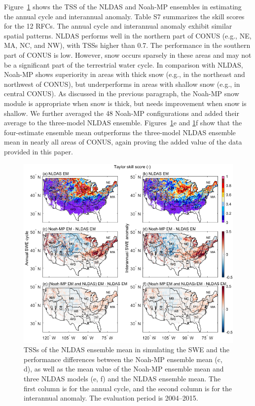 \documentclass[essd, manuscript]{copernicus}
\begin{document}
Figure~\ref{fig:swe:anom:tss} shows the TSS of the NLDAS and Noah-MP ensembles in estimating the annual cycle and interannual anomaly. Table S7 summarizes the skill scores for the 12 RFCs. The annual cycle and interannual anomaly exhibit similar spatial patterns. NLDAS performs well in the northern part of CONUS (e.g., NE, MA, NC, and NW), with TSSs higher than 0.7. The performance in the southern part of CONUS is low. However, snow occurs sparsely in these areas and may not be a significant part of the terrestrial water cycle. In comparison with NLDAS, Noah-MP shows superiority in areas with thick snow (e.g., in the northeast and northwest of CONUS), but underperforms in areas with shallow snow (e.g., in central CONUS). As discussed in the previous paragraph, the Noah-MP snow module is appropriate when snow is thick, but needs improvement when snow is shallow. We further averaged the 48 Noah-MP configurations and added their average to the three-model NLDAS ensemble. Figures~\ref{fig:swe:anom:tss}e and \ref{fig:swe:anom:tss}f show that the four-estimate ensemble mean outperforms the three-model NLDAS ensemble mean in nearly all areas of CONUS, again proving the added value of the data provided in this paper.

\begin{figure}[t]
  \includegraphics[width=12cm]{fig/fig09.pdf}
  \caption{TSSs of the NLDAS ensemble mean in simulating the SWE and the performance differences between the Noah-MP ensemble mean (c, d), as well as the mean value of the Noah-MP ensemble mean and three NLDAS models (e, f) and the NLDAS ensemble mean. The first column is for the annual cycle, and the second column is for the interannual anomaly. The evaluation period is 2004--2015.}
  \label{fig:swe:anom:tss}
\end{figure}
\end{document}
